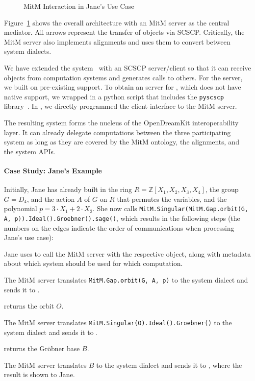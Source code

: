 \begin{figure}[ht]\centering\vspace*{-1em}
  \caption{MitM Interaction in Jane's Use Case}\label{fig:mitmpoc}\vspace*{-1em}
\end{figure}

Figure~\ref{fig:mitmpoc} shows the overall architecture with an MitM server as the central mediator.
All arrows represent the transfer of \OMMT objects via SCSCP.
Critically, the MitM server also implements alignments and uses them to convert between system dialects.

We have extended the \MMT system~\cite{Rabe:MAGMS13} with an SCSCP server/client so that it can receive objects from computation systems and generates calls to others.
For the \GAP server, we built on pre-existing \SCSCP support.
To obtain an \SCSCP server for \Singular, which does not have native \SCSCP support, we wrapped \Singular in a python script that includes the \lstinline|pyscscp| library~\cite{py-scscp:on}.
In \Sage, we directly programmed the client interface to the MitM server. 

The resulting system forms the nucleus of the OpenDreamKit interoperability layer. It can already delegate computations between the three participating system  as long as they are covered by the MitM ontology, the alignments, and the system APIs. 

\paragraph{Case Study: Jane's Example} 

Initially, Jane has already built in \Sage the ring $R=\mathbb{Z}[X_1,X_2,X_3,X_4]$, the group $G=D_4$, and the action $A$ of $G$ on $R$ that permutes the variables, and the polynomial $p = 3\cdot X_1 + 2\cdot X_2$.  She now calls \lstinline|MitM.Singular(MitM.Gap.orbit(G, A, p)).Ideal().Groebner().sage()|, which results in the following steps (the numbers on the edges indicate the order of communications when processing Jane's use case):
\begin{compactenum}
  \item Jane uses \Sage to call the MitM server with the respective \Sage object, along with metadata about which system should be used for which computation.
  \item The MitM server translates \lstinline|MitM.Gap.orbit(G, A, p)| to the \GAP system dialect and sends it to \GAP.
  \item \GAP returns the orbit $O$.
  \item The MitM server translates \lstinline|MitM.Singular(O).Ideal().Groebner()| to the \Singular system dialect and sends it to \Singular.
  \item \Singular returns the Gröbner base $B$.
  \item The MitM server translates $B$ to the \Sage system dialect and sends it to \Sage, where the result is shown to Jane.
\end{compactenum}

